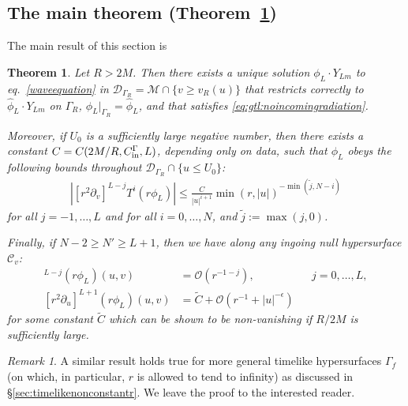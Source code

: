 \documentclass[11pt,english]{article}
\numberwithin{equation}{section}
\newtheorem{thm}{Theorem}[section]
\theoremstyle{remark}
\newtheorem{rem}{Remark}[section]
\theoremstyle{plain}
\theoremstyle{remark}
\newcommand{\pu}{\partial_u}
\newcommand{\pv}{\partial_v}
\renewcommand{\(}{\left(}
\renewcommand{\)}{\right)}
\begin{document}
\subsection{The main theorem (Theorem~\ref{thm:gtl})}
The main result of this section is
\begin{thm}\label{thm:gtl}
Let $R>2M$. Then there exists a unique solution $\phi_L\cdot Y_{Lm}$ to eq.\ \eqref{waveequation} in $\mathcal{D}_{\Gamma_R}=\mathcal{M}\cap\{v\geq v_R(u)\}$ that restricts correctly to $\hat{\phi}_L \cdot Y_{Lm}$ on $\Gamma_R$, $\phi_L|_{\Gamma_R}=\hat{\phi}_L$, and that satisfies \eqref{eq:gtl:noincomingradiation}.

Moreover, if $U_0$ is a sufficiently large negative number, then there exists a constant $C=C(2M/R,C_{\mathrm{in}}^\Gamma,L)$, depending only on data, such that $\phi_L$ obeys the following bounds throughout $\mathcal{D}_{\Gamma_R}\cap\{u\leq U_0\}$:
\begin{align}\label{eq:thm:gtlmain}
\left|[r^2\pv]^{L-j}T^i(r\phi_L)\right|\leq \frac{C}{|u|^{i+1}}\min(r,|u|)^{-\min{(\tilde{j},N-i)}}
\end{align}
for all $j=-1,\dots, L$ and for all $i=0,\dots, N$,  and $\tilde{j}:=\max(j,0)$.

Finally, if  $N-2\geq N'\geq L+1$, then we have along any ingoing null hypersurface $\mathcal{C}_v$:
\begin{align}
[r^2\pu]^{L-j}(r\phi_L)(u,v)&=\mathcal{O}(r^{-1-j}),&&j=0,\dots, L,\label{eq:thm:gtl:notlimit}\\
[r^2\pu]^{L+1}(r\phi_L)(u,v)&=\tilde{C}+\mathcal{O}(r^{-1}+|u|^{-\epsilon})&&\label{eq:thm:gtl:limit}
\end{align}
for some constant $\tilde{C}$ which can be shown to be non-vanishing if $R/2M$ is sufficiently large.
\end{thm}
\begin{rem}
A similar result holds true for more general timelike hypersurfaces $\Gamma_f$ (on which, in particular, $r$ is allowed to tend to infinity) as discussed in \S \ref{sec:timelikenonconstantr}. We leave the proof to the interested reader.
\end{rem}
\end{document}
